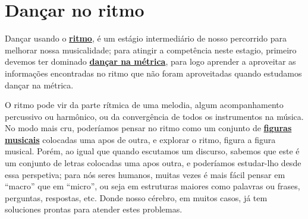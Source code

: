 
\newpage
\section{Dançar no ritmo}
\label{subsec:dancaritmo}
 Dançar usando o \hyperref[sec:pos:Ritmo]{\textbf{ritmo}},
é um estágio intermediário de nosso percorrido para melhorar nossa musicalidade;
para atingir a competência neste estagio, 
primeiro devemos ter dominado \hyperref[subsec:dancametrica]{\textbf{dançar na métrica}},
para logo aprender a aproveitar as informações encontradas 
no ritmo que não foram aproveitadas quando estudamos dançar na métrica. 

O ritmo pode vir da parte rítmica de uma melodia, 
algum acompanhamento percussivo ou harmônico, 
ou da convergência de todos os instrumentos na música.
No modo mais cru, poderíamos pensar no ritmo
como um conjunto de \hyperref[sec:figurasmusicais]{\textbf{figuras musicais}} 
colocadas uma apos de outra, 
e explorar o ritmo, figura a figura musical. %
Porém, ao igual que quando escutamos um discurso,
sabemos que este é um conjunto de letras colocadas uma apos outra,
e poderíamos estudar-lho desde essa perspetiva;
para nós seres humanos, 
muitas vezes é mais fácil pensar em ``macro'' que em ``micro'',
ou seja em estruturas maiores como palavras ou frases, perguntas, respostas, etc. 
Donde nosso cérebro, em muitos casos, 
já tem soluciones prontas para atender estes problemas.



